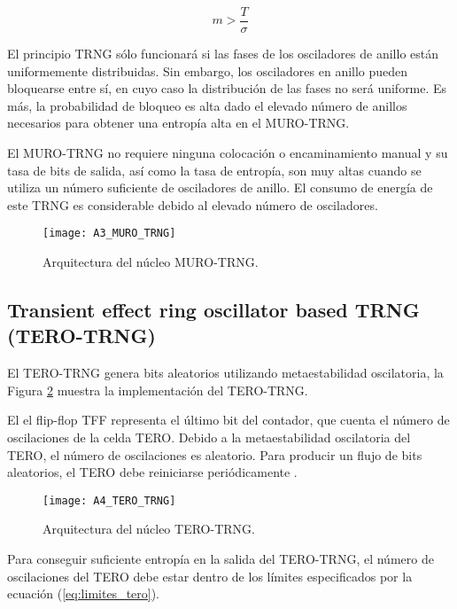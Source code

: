 			    \begin{equation}
			     m > \frac{T}{\sigma} 
			     \label{eq:muro_condicion}
			    \end{equation}	

            El principio TRNG sólo funcionará si las fases de los osciladores de anillo están uniformemente distribuidas. Sin embargo, los osciladores en anillo pueden bloquearse entre sí, en cuyo caso la distribución de las fases no será uniforme. Es más, la probabilidad de bloqueo es alta dado el elevado número de anillos necesarios para obtener una entropía alta en el MURO-TRNG.

            El MURO-TRNG no requiere ninguna colocación o encaminamiento manual y su tasa de bits de salida, así como la tasa de entropía, son muy altas cuando se utiliza un número suficiente de osciladores de anillo. El consumo de energía de este TRNG es considerable debido al elevado número de osciladores.
				
				\begin{figure}[hbtp]
					\centering
					\texttt{[image: A3\_MURO\_TRNG]}
					\caption{Arquitectura del núcleo MURO-TRNG.}
					\label{fig:A3_MURO_TRNG}
				\end{figure}


		\subsection{Transient effect ring oscillator based TRNG (TERO-TRNG)}

            El TERO-TRNG genera bits aleatorios utilizando metaestabilidad oscilatoria, la Figura \ref{fig:A4_TERO_TRNG} muestra la implementación del TERO-TRNG.

            El el flip-flop TFF representa el último bit del contador, que cuenta el número de oscilaciones de la celda TERO. Debido a la metaestabilidad oscilatoria del TERO, el número de oscilaciones es aleatorio. Para producir un flujo de bits aleatorios, el TERO debe reiniciarse periódicamente \cite{Haddad2015}.
	
            \begin{figure}[hbtp]
                \centering
                \texttt{[image: A4\_TERO\_TRNG]}
                \caption{Arquitectura del núcleo TERO-TRNG.}
                \label{fig:A4_TERO_TRNG}
            \end{figure}

            Para conseguir suficiente entropía en la salida del TERO-TRNG, el número de oscilaciones del TERO debe estar dentro de los límites especificados por la ecuación (\ref{eq:limites_tero}).

